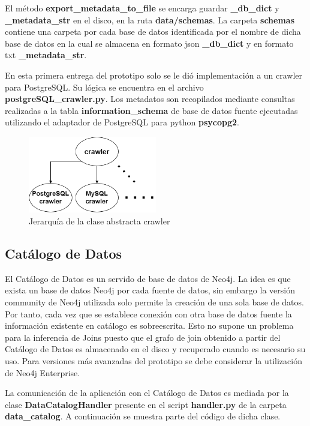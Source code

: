 El m\'etodo \textbf{export\_metadata\_to\_file} se encarga guardar \textbf{\_db\_dict} y \textbf{\_metadata\_str} en el disco, 
en la ruta \textbf{data/schemas}. La carpeta \textbf{schemas} contiene una carpeta por cada base de datos identificada 
por el nombre de dicha base de datos en la cual se almacena en formato json \textbf{\_db\_dict} y en formato txt 
\textbf{\_metadata\_str}.

En esta primera entrega del prototipo solo se le di\'o implementaci\'on a un crawler para PostgreSQL. Su l\'ogica 
se encuentra en el archivo \textbf{postgreSQL\_crawler.py}. Los metadatos son recopilados mediante consultas realizadas
a la tabla \textbf{information\_schema} de base de datos fuente ejecutadas 
utilizando el adaptador de PostgreSQL para python \textbf{psycopg2}.

\begin{figure}[htb]
    \centering
    \includegraphics[width=0.5\textwidth]{Graphics/crawler_class.drawio.png}
    \caption{Jerarqu\'ia de la clase abstracta crawler}
    \label{fig:crawler}
\end{figure}


\subsection{Cat\'alogo de Datos}

El Cat\'alogo de Datos es un servido de base de datos de Neo4j. La idea es que exista un base de datos Neo4j por cada 
fuente de datos, sin embargo la versi\'on community de Neo4j utilizada solo permite la creación de una sola base de datos. 
Por tanto, cada vez que se establece conexi\'on con otra base de datos fuente la informaci\'on existente en cat\'alogo es 
sobreescrita. Esto no supone un problema para la inferencia de Joins puesto que el grafo de join obtenido a partir 
del Cat\'alogo de Datos es almacenado en el disco y recuperado cuando es necesario su uso. Para versiones m\'as avanzadas 
del prototipo se debe considerar la utilizaci\'on de Neo4j Enterprise.

La comunicaci\'on de la aplicaci\'on con el Cat\'alogo de Datos es mediada por la clase \textbf{DataCatalogHandler} 
presente en el script \textbf{handler.py} de la carpeta \textbf{data\_catalog}. A continuación se muestra parte 
del c\'odigo de dicha clase.

